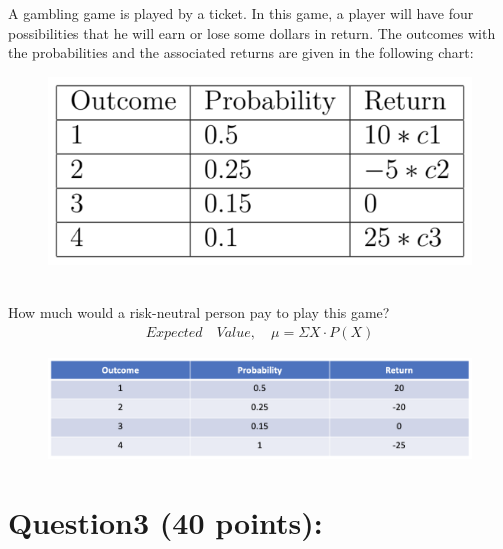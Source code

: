 \documentclass[a4paper, 11pt]{report}
\begin{document}
{A gambling game is played by a ticket. In this game, a player will have four possibilities that he will earn or lose some dollars in return. The outcomes with the probabilities and the associated returns are given in the following chart:
\begin{figure}[h]
\includegraphics[scale=.57]{2.png}
\centering
\end{figure}
\\
How much would a risk-neutral person pay to play this game?
\begin{align*}
Expected \quad Value, \quad \mu = \Sigma X \cdot P(X)
\end{align*}
\begin{figure}[h]
\includegraphics[scale=.57]{3.png}
\centering
\caption{{\color{blue}{$\mu = (20 \times 0.5) + (-20 \times 0.25) + (0 \times 0.15) + (-25 \times 1) = -30$}}}
\end{figure}

\newpage
\section*{\textbf{Question3 (40 points):}}

}
\end{document}
